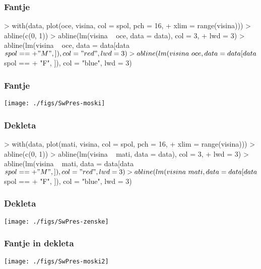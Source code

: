 \begin{frame}[fragile]
\frametitle{Fantje}
\begin{Schunk}
\begin{Sinput}
> with(data, plot(oce, visina, col = spol, pch = 16, 
+     xlim = range(visina)))
> abline(c(0, 1))
> abline(lm(visina ~ oce, data = data), col = 3, 
+     lwd = 3)
> abline(lm(visina ~ oce, data = data[data$spol == 
+     "M", ]), col = "red", lwd = 3)
> abline(lm(visina ~ oce, data = data[data$spol == 
+     "F", ]), col = "blue", lwd = 3)
\end{Sinput}
\end{Schunk}
\end{frame}

\begin{frame}[fragile]
\frametitle{Fantje}
\texttt{[image: ./figs/SwPres-moski]}
\end{frame}
\clearpage
\begin{frame}[fragile]
\frametitle{Dekleta}
\begin{Schunk}
\begin{Sinput}
> with(data, plot(mati, visina, col = spol, pch = 16, 
+     xlim = range(visina)))
> abline(c(0, 1))
> abline(lm(visina ~ mati, data = data), col = 3, 
+     lwd = 3)
> abline(lm(visina ~ mati, data = data[data$spol == 
+     "M", ]), col = "red", lwd = 3)
> abline(lm(visina ~ mati, data = data[data$spol == 
+     "F", ]), col = "blue", lwd = 3)
\end{Sinput}
\end{Schunk}
\end{frame}

\begin{frame}[fragile]
\frametitle{Dekleta}
\texttt{[image: ./figs/SwPres-zenske]}
\end{frame}
\clearpage
{}
\begin{frame}[fragile]
\frametitle{Fantje in dekleta}
\texttt{[image: ./figs/SwPres-moski2]}
\end{frame}



%
%
\clearpage
